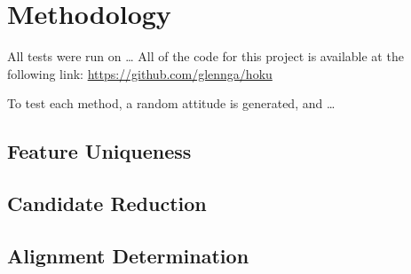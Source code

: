 \section{Methodology}\label{sec:methodology}
All tests were run on \ldots
All of the code for this project is available at the following link: \url{https://github.com/glennga/hoku}

To test each method, a random attitude is generated, and \ldots

\subsection{Feature Uniqueness}\label{subsec:featureUniquenessMethods}

\subsection{Candidate Reduction}\label{subsec:candidateReductionMethods}

\subsection{Alignment Determination}\label{subsec:alignmentDeterminationMethods}